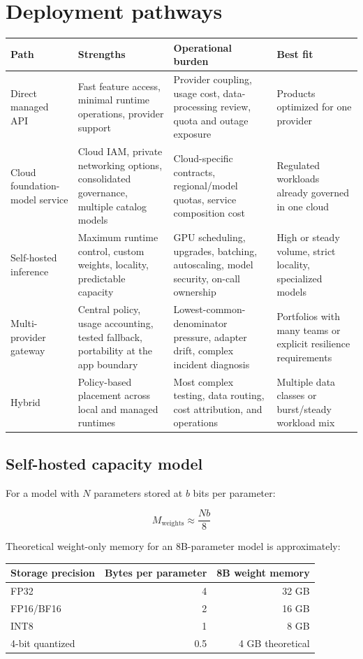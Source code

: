 \documentclass[10pt]{article}
\begin{document}
\section{Deployment pathways}

\begin{tabularx}{\textwidth}{P{0.18\textwidth} Y Y Y}
\toprule
\textbf{Path} & \textbf{Strengths} & \textbf{Operational burden} & \textbf{Best fit} \\
\midrule
Direct managed API & Fast feature access, minimal runtime operations, provider support & Provider coupling, usage cost, data-processing review, quota and outage exposure & Products optimized for one provider \\
\addlinespace
Cloud foundation-model service & Cloud IAM, private networking options, consolidated governance, multiple catalog models & Cloud-specific contracts, regional/model quotas, service composition cost & Regulated workloads already governed in one cloud \\
\addlinespace
Self-hosted inference & Maximum runtime control, custom weights, locality, predictable capacity & GPU scheduling, upgrades, batching, autoscaling, model security, on-call ownership & High or steady volume, strict locality, specialized models \\
\addlinespace
Multi-provider gateway & Central policy, usage accounting, tested fallback, portability at the app boundary & Lowest-common-denominator pressure, adapter drift, complex incident diagnosis & Portfolios with many teams or explicit resilience requirements \\
\addlinespace
Hybrid & Policy-based placement across local and managed runtimes & Most complex testing, data routing, cost attribution, and operations & Multiple data classes or burst/steady workload mix \\
\bottomrule
\end{tabularx}

\subsection{Self-hosted capacity model}

For a model with \(N\) parameters stored at \(b\) bits per parameter:

\[
M_{\mathrm{weights}} \approx \frac{N b}{8}
\]

Theoretical weight-only memory for an 8B-parameter model is approximately:

\begin{center}
\begin{tabular}{lrr}
\toprule
\textbf{Storage precision} & \textbf{Bytes per parameter} & \textbf{8B weight memory} \\
\midrule
FP32 & 4 & 32 GB \\
FP16/BF16 & 2 & 16 GB \\
INT8 & 1 & 8 GB \\
4-bit quantized & 0.5 & 4 GB theoretical \\
\bottomrule
\end{tabular}
\end{center}
\end{document}
